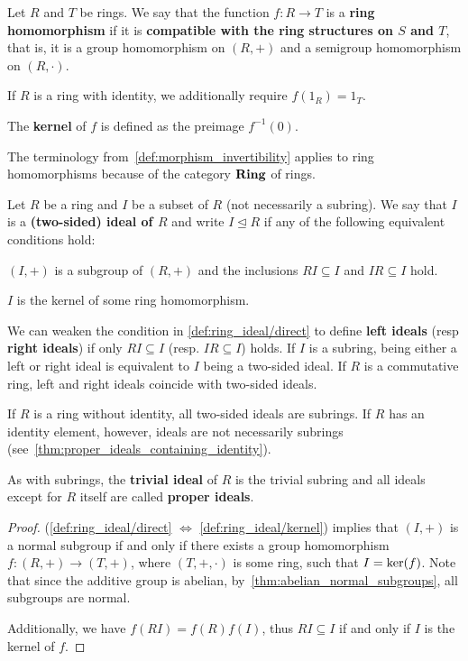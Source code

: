 \begin{definition}\label{def:ring_homomorphism}
  Let \( R \) and \( T \) be rings. We say that the function \( f: R \to T \) is a \textbf{ring homomorphism} if it is \textbf{compatible with the ring structures on \( S \) and \( T \)}, that is, it is a group homomorphism on \( (R, +) \) and a semigroup homomorphism on \( (R, \cdot) \).

  If \( R \) is a ring with identity, we additionally require \( f(1_R) = 1_T \).

  The \textbf{kernel} of \( f \) is defined as the preimage \( f^{-1}(0) \).

  The terminology from~\cref{def:morphism_invertibility} applies to ring homomorphisms because of the category \( \operatorname{\mathbf{Ring}} \) of rings.
\end{definition}

\begin{definition}\label{def:ring_ideal}
  Let \( R \) be a ring and \( I \) be a subset of \( R \) (not necessarily a subring). We say that \( I \) is a \textbf{(two-sided) ideal of \( R \)} and write \( I \unlhd R \) if any of the following equivalent conditions hold:
  \begin{defenum}
    \item\label{def:ring_ideal/direct} \( (I, +) \) is a subgroup of \( (R, +) \) and the inclusions \( RI \subseteq I \) and \( IR \subseteq I \) hold.
    \item\label{def:ring_ideal/kernel} \( I \) is the kernel of some ring homomorphism.
  \end{defenum}

  We can weaken the condition in \ref{def:ring_ideal/direct} to define \textbf{left ideals} (resp \textbf{right ideals}) if only \( RI \subseteq I \) (resp. \( IR \subseteq I \)) holds. If \( I \) is a subring, being either a left or right ideal is equivalent to \( I \) being a two-sided ideal. If \( R \) is a commutative ring, left and right ideals coincide with two-sided ideals.

  If \( R \) is a ring without identity, all two-sided ideals are subrings. If \( R \) has an identity element, however, ideals are not necessarily subrings (see~\cref{thm:proper_ideals_containing_identity}).

  As with subrings, the \textbf{trivial ideal} of \( R \) is the trivial subring and all ideals except for \( R \) itself are called \textbf{proper ideals}.
\end{definition}
\begin{proof}
  (\ref{def:ring_ideal/direct} \( \iff \) \ref{def:ring_ideal/kernel})  implies that \( (I, +) \) is a normal subgroup if and only if there exists a group homomorphism \( f: (R, +) \to (T, +) \), where \( (T, +, \cdot) \) is some ring, such that \( I = \operatorname{ker}(f) \). Note that since the additive group is abelian, by~\cref{thm:abelian_normal_subgroups}, all subgroups are normal.

  Additionally, we have \( f(RI) = f(R)f(I) \), thus \( RI \subseteq I \) if and only if \( I \) is the kernel of \( f \).
\end{proof}

